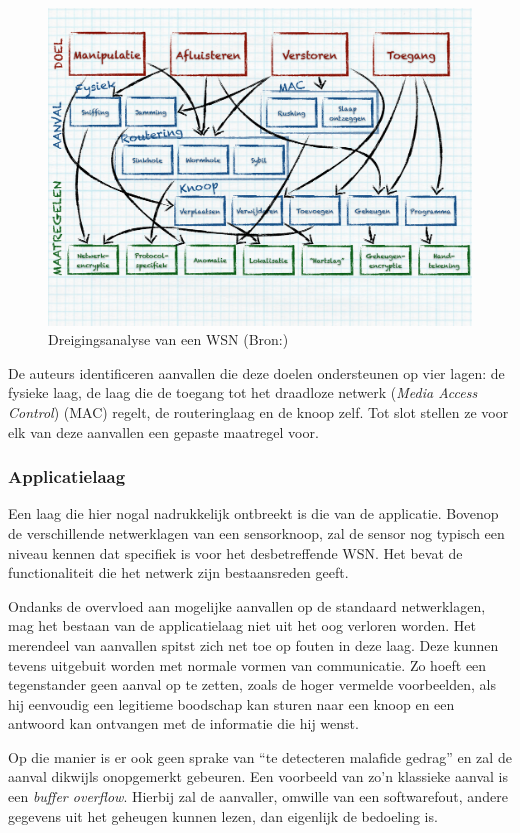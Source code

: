 \begin{figure}[ht]
  \centering
  \includegraphics[width=0.95\linewidth]{resources/wsn-threat-analysis.pdf}
  \caption[Dreigingsanalyse van een WSN]{Dreigingsanalyse van een WSN (Bron:\citep{aschenbruck2012security})}
  \label{fig:wsn-threat-analysis}
\end{figure}

\vspace{-2mm}

De auteurs identificeren aanvallen die deze doelen ondersteunen op vier lagen:
de fysieke laag, de laag die de toegang tot het draadloze netwerk (\emph{Media
Access Control}) (MAC) regelt, de routeringlaag en de knoop zelf.
Tot slot stellen ze voor elk van deze aanvallen een gepaste maatregel voor.

\vspace{-2mm}

\subsubsection*{Applicatielaag}

Een laag die hier nogal nadrukkelijk ontbreekt is die van de applicatie.
Bovenop de verschillende netwerklagen van een sensorknoop, zal de sensor nog
typisch een niveau kennen dat specifiek is voor het desbetreffende WSN. Het
bevat de functionaliteit die het netwerk zijn bestaansreden geeft.

Ondanks de overvloed aan mogelijke aanvallen op de standaard netwerklagen, mag
het bestaan van de applicatielaag niet uit het oog verloren worden. Het
merendeel van aanvallen spitst zich net toe op fouten in deze laag. Deze kunnen
tevens uitgebuit worden met normale vormen van communicatie. Zo hoeft een
tegenstander geen aanval op te zetten, zoals de hoger vermelde voorbeelden, als
hij eenvoudig een legitieme boodschap kan sturen naar een knoop en een antwoord
kan ontvangen met de informatie die hij wenst.

Op die manier is er ook geen sprake van ``te detecteren malafide gedrag'' en
zal de aanval dikwijls onopgemerkt gebeuren. Een voorbeeld van zo'n klassieke
aanval is een \emph{buffer overflow}. Hierbij zal de aanvaller, omwille van een
softwarefout, andere gegevens uit het geheugen kunnen lezen, dan eigenlijk de
bedoeling is.
